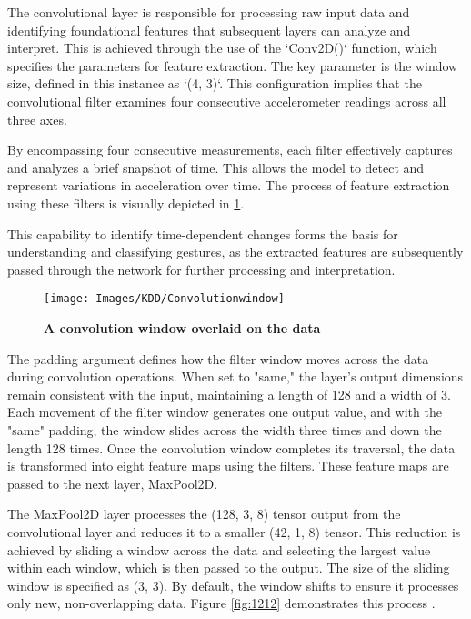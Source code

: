 The convolutional layer is responsible for processing raw input data and identifying foundational features that subsequent layers can analyze and interpret. This is achieved through the use of the `Conv2D()` function, which specifies the parameters for feature extraction. The key parameter is the window size, defined in this instance as `(4, 3)`. This configuration implies that the convolutional filter examines four consecutive accelerometer readings across all three axes.

By encompassing four consecutive measurements, each filter effectively captures and analyzes a brief snapshot of time. This allows the model to detect and represent variations in acceleration over time. The process of feature extraction using these filters is visually depicted in \ref{fig:Convolution window}. 

This capability to identify time-dependent changes forms the basis for understanding and classifying gestures, as the extracted features are subsequently passed through the network for further processing and interpretation.

\begin{figure}[H]
	\texttt{[image: Images/KDD/Convolutionwindow]}
	\caption{\textbf{A convolution window overlaid on the data}}
	\label{fig:Convolution window}
\end{figure}

The padding argument defines how the filter window moves across the data during convolution operations. When set to "same," the layer's output dimensions remain consistent with the input, maintaining a length of 128 and a width of 3. Each movement of the filter window generates one output value, and with the "same" padding, the window slides across the width three times and down the length 128 times. Once the convolution window completes its traversal, the data is transformed into eight feature maps using the filters. These feature maps are passed to the next layer, MaxPool2D.

The MaxPool2D layer processes the (128, 3, 8) tensor output from the convolutional layer and reduces it to a smaller (42, 1, 8) tensor. This reduction is achieved by sliding a window across the data and selecting the largest value within each window, which is then passed to the output. The size of the sliding window is specified as (3, 3). By default, the window shifts to ensure it processes only new, non-overlapping data. Figure \ref{fig:1212} demonstrates this process \cite{Warden:2020}.

